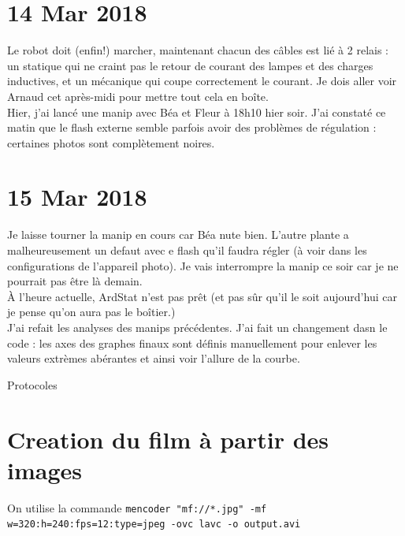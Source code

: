 \documentclass[10pt,a4paper]{article}
\begin{document}
\section{14 Mar 2018}
Le robot doit (enfin!) marcher, maintenant chacun des câbles est lié à 2 relais : un statique qui ne craint pas le retour de courant des lampes et des charges inductives, et un mécanique qui coupe correctement le courant. Je dois aller voir Arnaud cet après-midi pour mettre tout cela en boîte.\\

Hier, j'ai lancé une manip avec Béa et Fleur à 18h10 hier soir. J'ai constaté ce matin que le flash externe semble parfois avoir des problèmes de régulation : certaines photos sont complètement noires.

\section{15 Mar 2018}
Je laisse tourner la manip en cours car Béa nute bien. L'autre plante a malheureusement un defaut avec e flash qu'il faudra régler (à voir dans les configurations de l'appareil photo). Je vais interrompre la manip ce soir car je ne pourrait pas être là demain.\\

À l'heure actuelle, ArdStat n'est pas prêt (et pas sûr qu'il le soit aujourd'hui car je pense qu'on aura pas le boîtier.)\\

J'ai refait les analyses des manips précédentes. J'ai fait un changement dasn le code : les axes des graphes finaux sont définis manuellement pour enlever les valeurs extrèmes abérantes et ainsi voir l'allure de la courbe.


\newpage
\begin{center}
    {\Huge Protocoles}
\end{center}
\appendix
\setcounter{secnumdepth}{1}

\section{Creation du film à partir des images\label{film}}
On utilise la commande \texttt{mencoder "mf://*.jpg" -mf w=320:h=240:fps=12:type=jpeg -ovc lavc -o output.avi}
\end{document}
